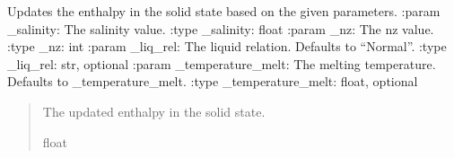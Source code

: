 \documentclass[a4paper,11pt,english,openany]{sphinxmanual}
\begin{document}

\begin{fulllineitems}
\label{\detokenize{api/spyice.update_physical_values:src.spyice.update_physical_values.update_enthalpy_solid_state}}
\pysigstartsignatures
\pysiglinewithargsret
{}
{\sphinxparamcomma {}\sphinxparamcomma {}\sphinxparamcomma {}}
{}
\pysigstopsignatures
\sphinxAtStartPar
Updates the enthalpy in the solid state based on the given parameters.
:param \_salinity: The salinity value.
:type \_salinity: float
:param \_nz: The nz value.
:type \_nz: int
:param \_liq\_rel: The liquid relation. Defaults to “Normal”.
:type \_liq\_rel: str, optional
:param \_temperature\_melt: The melting temperature. Defaults to \_temperature\_melt.
:type \_temperature\_melt: float, optional
\begin{quote}\begin{description}
\sphinxAtStartPar
The updated enthalpy in the solid state.

\sphinxAtStartPar
float

\end{description}\end{quote}

\end{fulllineitems}

\end{document}
